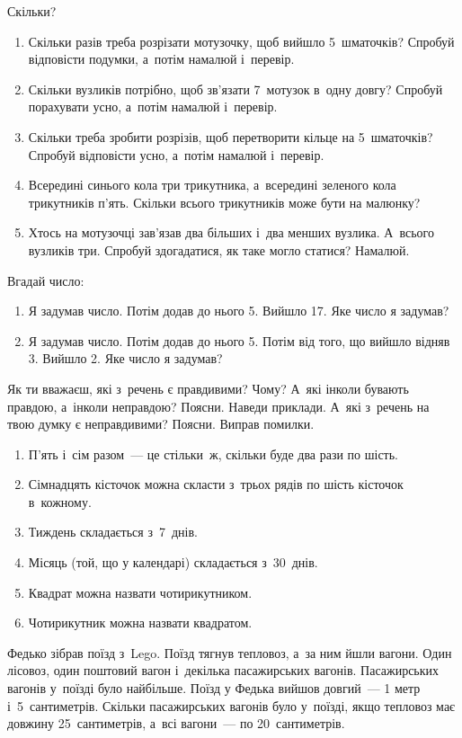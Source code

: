 \problem
Скільки?
\begin{enumerate}
  \item Скільки разів треба розрізати мотузочку, щоб вийшло 5~шматочків?
  Спробуй відповісти подумки, а~потім намалюй і~перевір.
  \item Скільки вузликів потрібно, щоб зв'язати 7~мотузок в~одну довгу?
  Спробуй порахувати усно, а~потім намалюй і~перевір.
  \item Скільки треба зробити розрізів, щоб перетворити кільце
  на 5~шматочків? Спробуй відповісти усно, а~потім намалюй і~перевір.
  \item Всередині синього кола три трикутника, а~всередині зеленого кола
  трикутників п'ять. Скільки всього трикутників може бути на малюнку?
  \item Хтось на мотузочці зав'язав два більших і~два менших вузлика.
  А~всього вузликів три. Спробуй здогадатися, як таке могло статися? Намалюй.
\end{enumerate}


\problem
Вгадай число:
\begin{enumerate}
  \item Я задумав число. Потім додав до нього 5. Вийшло 17.
  Яке число я задумав?
  \item Я задумав число. Потім додав до нього 5.
  Потім від того, що вийшло відняв 3. Вийшло 2.
  Яке число я задумав?
\end{enumerate}


\problem
Як ти вважаєш, які з~речень є правдивими? Чому?
А~які інколи бувають правдою, а~інколи неправдою? Поясни. Наведи приклади.
А~які з~речень на твою думку є неправдивими? Поясни. Виправ помилки.
\begin{enumerate}
  \item П'ять і~сім разом~--- це стільки~ж, скільки буде два рази по шість.
  \item Сімнадцять кісточок можна скласти з~трьох рядів
  по шість кісточок в~кожному.
  \item Тиждень складається з~7~днів.
  \item Місяць (той, що у календарі) складається з~30~днів.
  \item Квадрат можна назвати чотирикутником.
  \item Чотирикутник можна назвати квадратом.
\end{enumerate}


\problem
Федько зібрав поїзд з~Lego. Поїзд тягнув тепловоз, а~за ним йшли вагони.
Один лісовоз, один поштовий вагон і~декілька пасажирських вагонів.
Пасажирських вагонів у~поїзді було найбільше.
Поїзд у Федька вийшов довгий~--- 1 метр і~5~сантиметрів.
Скільки пасажирських вагонів було у~поїзді,
якщо тепловоз має довжину 25~сантиметрів, а~всі вагони~--- по 20~сантиметрів.


